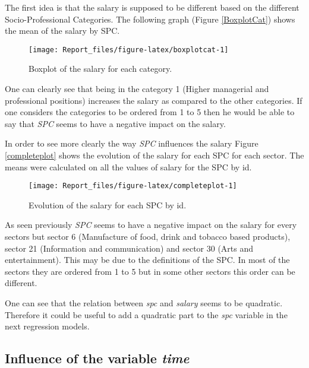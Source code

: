 \documentclass[]{article}
\begin{document}
The first idea is that the salary is supposed to be different based on
the different Socio-Professional Categories. The following graph (Figure
\ref{BoxplotCat}) shows the mean of the salary by SPC.

\begin{figure}[H]

\texttt{[image: Report\_files/figure-latex/boxplotcat-1]} \hfill{}

\caption{Boxplot of the salary for each category. \label{BoxplotCat}}\label{fig:boxplotcat}
\end{figure}

One can clearly see that being in the category 1 (Higher managerial and
professional positions) increases the salary as compared to the other
categories. If one considers the categories to be ordered from 1 to 5
then he would be able to say that \emph{SPC} seems to have a negative
impact on the salary.

In order to see more clearly the way \emph{SPC} influences the salary
Figure \ref{completeplot} shows the evolution of the salary for each SPC
for each sector. The means were calculated on all the values of salary
for the SPC by id.

\begin{figure}[H]

\texttt{[image: Report\_files/figure-latex/completeplot-1]} \hfill{}

\caption{Evolution of the salary for each SPC by id. \label{completeplot}}\label{fig:completeplot}
\end{figure}

As seen previously \emph{SPC} seems to have a negative impact on the
salary for every sectors but sector 6 (Manufacture of food, drink and
tobacco based products), sector 21 (Information and communication) and
sector 30 (Arts and entertainment). This may be due to the definitions
of the SPC. In most of the sectors they are ordered from 1 to 5 but in
some other sectors this order can be different.

One can see that the relation between \emph{spc} and \emph{salary} seems
to be quadratic. Therefore it could be useful to add a quadratic part to
the \emph{spc} variable in the next regression models.

\newpage

\subsection{Influence of the variable
\emph{time}}\label{influence-of-the-variable-time}
\end{document}
